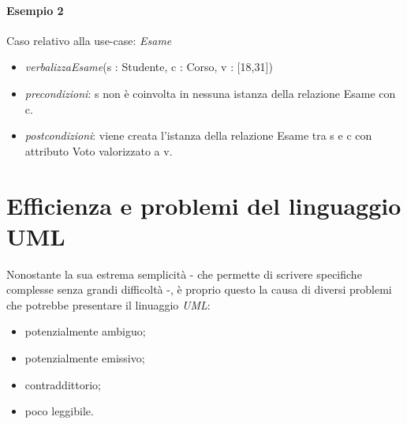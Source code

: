 \paragraph{Esempio 2}
Caso relativo alla use-case: \textit{Esame}
\begin{itemize}
    \item \textit{verbalizzaEsame}(s : Studente, c : Corso, v : [18,31])
    \item \textit{precondizioni}: s non è coinvolta in nessuna istanza della relazione Esame con c.
	\item \textit{postcondizioni}: viene creata l'istanza della relazione Esame tra s e c con attributo Voto valorizzato a v.
\end{itemize}

\section{Efficienza e problemi del linguaggio UML}
Nonostante la sua estrema semplicità - che permette di scrivere specifiche complesse senza grandi difficoltà -, è proprio questo la causa di diversi problemi che potrebbe presentare il linuaggio \textit{UML}:
\begin{itemize}
    \item potenzialmente ambiguo;
    \item potenzialmente emissivo;
    \item contraddittorio;
    \item poco leggibile.
\end{itemize}